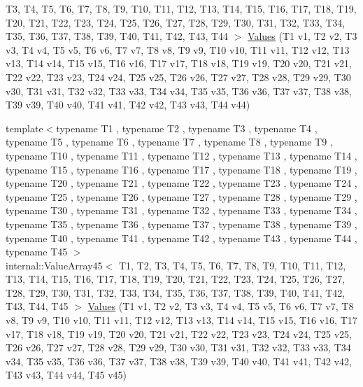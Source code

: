 \begin{DoxyCompactItemize}
\-T3, \-T4, \-T5, \-T6, \-T7, \-T8, \-T9, \*
\-T10, \-T11, \-T12, \-T13, \-T14, \-T15, \*
\-T16, \-T17, \-T18, \-T19, \-T20, \-T21, \*
\-T22, \-T23, \-T24, \-T25, \-T26, \-T27, \*
\-T28, \-T29, \-T30, \-T31, \-T32, \-T33, \*
\-T34, \-T35, \-T36, \-T37, \-T38, \-T39, \*
\-T40, \-T41, \-T42, \-T43, \-T44 $>$ \hyperlink{namespacetesting_a42848f3794e196c5a74f4b21db0752dd}{\-Values} (\-T1 v1, \-T2 v2, \-T3 v3, \-T4 v4, \-T5 v5, \-T6 v6, \-T7 v7, \-T8 v8, \-T9 v9, \-T10 v10, \-T11 v11, \-T12 v12, \-T13 v13, \-T14 v14, \-T15 v15, \-T16 v16, \-T17 v17, \-T18 v18, \-T19 v19, \-T20 v20, \-T21 v21, \-T22 v22, \-T23 v23, \-T24 v24, \-T25 v25, \-T26 v26, \-T27 v27, \-T28 v28, \-T29 v29, \-T30 v30, \-T31 v31, \-T32 v32, \-T33 v33, \-T34 v34, \-T35 v35, \-T36 v36, \-T37 v37, \-T38 v38, \-T39 v39, \-T40 v40, \-T41 v41, \-T42 v42, \-T43 v43, \-T44 v44)
\item 
{\footnotesize template$<$typename T1 , typename T2 , typename T3 , typename T4 , typename T5 , typename T6 , typename T7 , typename T8 , typename T9 , typename T10 , typename T11 , typename T12 , typename T13 , typename T14 , typename T15 , typename T16 , typename T17 , typename T18 , typename T19 , typename T20 , typename T21 , typename T22 , typename T23 , typename T24 , typename T25 , typename T26 , typename T27 , typename T28 , typename T29 , typename T30 , typename T31 , typename T32 , typename T33 , typename T34 , typename T35 , typename T36 , typename T37 , typename T38 , typename T39 , typename T40 , typename T41 , typename T42 , typename T43 , typename T44 , typename T45 $>$ }\\internal\-::\-Value\-Array45$<$ \-T1, \-T2, \*
\-T3, \-T4, \-T5, \-T6, \-T7, \-T8, \-T9, \*
\-T10, \-T11, \-T12, \-T13, \-T14, \-T15, \*
\-T16, \-T17, \-T18, \-T19, \-T20, \-T21, \*
\-T22, \-T23, \-T24, \-T25, \-T26, \-T27, \*
\-T28, \-T29, \-T30, \-T31, \-T32, \-T33, \*
\-T34, \-T35, \-T36, \-T37, \-T38, \-T39, \*
\-T40, \-T41, \-T42, \-T43, \-T44, \-T45 $>$ \hyperlink{namespacetesting_a227b4b3b251f5f4aa0e1261c27fe9dd4}{\-Values} (\-T1 v1, \-T2 v2, \-T3 v3, \-T4 v4, \-T5 v5, \-T6 v6, \-T7 v7, \-T8 v8, \-T9 v9, \-T10 v10, \-T11 v11, \-T12 v12, \-T13 v13, \-T14 v14, \-T15 v15, \-T16 v16, \-T17 v17, \-T18 v18, \-T19 v19, \-T20 v20, \-T21 v21, \-T22 v22, \-T23 v23, \-T24 v24, \-T25 v25, \-T26 v26, \-T27 v27, \-T28 v28, \-T29 v29, \-T30 v30, \-T31 v31, \-T32 v32, \-T33 v33, \-T34 v34, \-T35 v35, \-T36 v36, \-T37 v37, \-T38 v38, \-T39 v39, \-T40 v40, \-T41 v41, \-T42 v42, \-T43 v43, \-T44 v44, \-T45 v45)
\item 

\end{DoxyCompactItemize}
